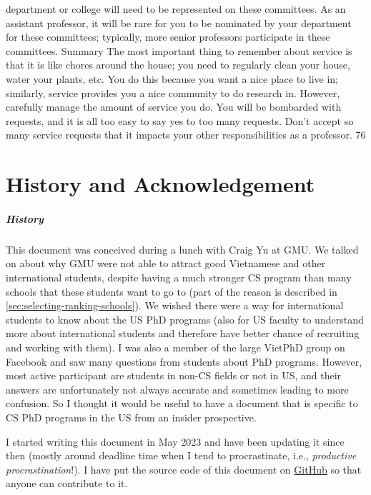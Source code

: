 \documentclass[oneside,11pt]{memoir}
\begin{document}
department or college will need to be represented on these committees. As an assistant
professor, it will be rare for you to be nominated by your department for these committees;
typically, more senior professors participate in these committees.
Summary
The most important thing to remember about service is that it is like chores around the house;
you need to regularly clean your house, water your plants, etc. You do this because you want a
nice place to live in; similarly, service provides you a nice community to do research in. However,
carefully manage the amount of service you do. You will be bombarded with requests, and it is
all too easy to say yes to too many requests. Don’t accept so many service requests that it
impacts your other responsibilities as a professor.
76


\chapter{History and Acknowledgement}\label{sec:ack}

\paragraph{History} This document was conceived during a lunch with Craig Yu at GMU.  We talked on about why GMU were not able to attract good Vietnamese and other international students, despite having a much stronger CS program than many schools that these students want to go to (part of the reason is described in \autoref{sec:selecting-ranking-schools}). We wished there were a way for international students to know about the US PhD programs (also for US faculty to understand more about international students and therefore have better chance of recruiting and working with them). I was also a member of the large VietPhD group on Facebook and saw many questions from students about PhD programs.  However, most active participant are students in non-CS fields or not in US, and their answers are unfortunately not always accurate and sometimes leading to more confusion. So I thought it would be useful to have a document that is specific to CS PhD programs in the US from an insider prospective.

I started writing this document in May 2023 and have been updating it since then (mostly around deadline time when I tend to procrastinate, i.e., \emph{productive procrastination}!). I have put the source code of this document on \href{https://github.com/nguyenthanhvuh/phd-cs-us}{GitHub} so that anyone can contribute to it.  
\end{document}
